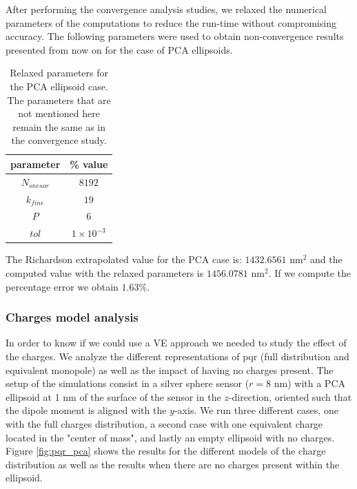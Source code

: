 After performing the convergence analysis studies, we relaxed the numerical parameters of the computations to reduce the run-time without 
compromising accuracy. The following parameters were used to obtain non-convergence results presented from now on for the case of PCA ellipsoids.

\begin{table}%
    \centering
    \caption{\label{table:rel_pca_par} Relaxed parameters for the PCA ellipsoid case. The parameters that are not 
    mentioned here remain the same as in the convergence study.} 
    \begin{tabular}{c c}
    \hline%
    parameter & \% value \\
    \hline%
     $N_{snesor}$ & $8192$ \\
     $k_{fine}$ & $19$ \\
     $P$ & $6$ \\
     $tol$ & $1\times 10^{-3}$ \\
    \hline%
    \end{tabular}
\end{table}

The Richardson extrapolated value for the PCA case is: $1432.6561$ nm$^2$ and the computed value with the relaxed parameters 
is $1456.0781$ nm$^2$. If we compute the percentage error we obtain $1.63 \%$.

\subsubsection{Charges model analysis}

In order to know if we could use a VE approach we needed to study the effect of the charges. We analyze
the different representations of pqr (full distribution and equivalent monopole) as well as the impact of having
no charges present. The setup of the simulations consist in a silver sphere sensor ($r=8$ nm) with a PCA ellipsoid 
at 1 nm of the surface of the sensor in the $z$-direction, oriented such that the dipole moment is aligned with the $y$-axis. We run 
three different cases, one with the full charges distribution, a second case with one equivalent charge located in the
"center of mass", and lastly an empty ellipsoid with no charges. Figure \ref{fig:pqr_pca} shows the results for the different models of the 
charge distribution as well as the results when there are no charges present within the ellipsoid. 


